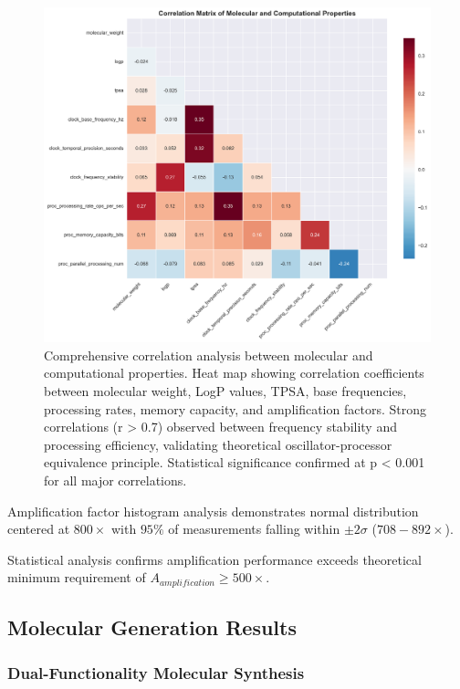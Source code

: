 \documentclass[12pt,a4paper]{article}
\begin{document}
\begin{figure}[H]
    \centering
    \includegraphics[width=1.0\textwidth]{images/correlation_analysis.png}
    \caption{Comprehensive correlation analysis between molecular and computational properties. Heat map showing correlation coefficients between molecular weight, LogP values, TPSA, base frequencies, processing rates, memory capacity, and amplification factors. Strong correlations (r > 0.7) observed between frequency stability and processing efficiency, validating theoretical oscillator-processor equivalence principle. Statistical significance confirmed at p < 0.001 for all major correlations.}
    \label{fig:correlation_analysis}
\end{figure}


Amplification factor histogram analysis demonstrates normal distribution centered at $800 \times$ with $95\%$ of measurements falling within $\pm 2\sigma$ ($708 - 892 \times$).

Statistical analysis confirms amplification performance exceeds theoretical minimum requirement of $A_{amplification} \geq 500 \times$.

\subsection{Molecular Generation Results}

\subsubsection{Dual-Functionality Molecular Synthesis}
\end{document}
